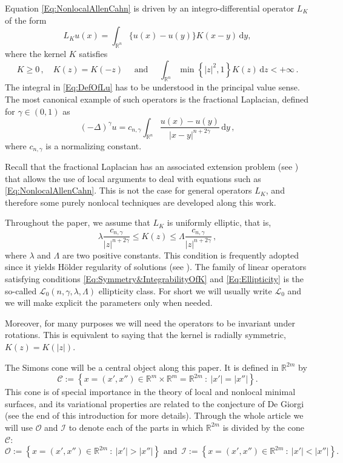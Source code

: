 \documentclass[12pt,reqno]{amsart}
\theoremstyle{definition}
\theoremstyle{remark}
\newcommand{\con}[1]{\mathbb{#1}}
\newcommand{\R}{\con{R}} %
\newcommand{\ccal}{\mathscr{C}}
\newcommand{\ical}{\mathcal{I}}
\newcommand{\lcal}{\mathcal{L}}
\newcommand{\ocal}{\mathcal{O}}
\newcommand{\s}{\gamma}
\newcommand{\fraclaplacian}{(-\Delta)^\s}
\renewcommand{\d}{\,\mathrm{d}} %
\newcommand{\setcond}[2]{\left \{ #1 \ : \ #2  \right \}}
\numberwithin{equation}{section}
\begin{document}
Equation \eqref{Eq:NonlocalAllenCahn} is driven by an integro-differential operator $L_K$ of the form
\begin{equation}
\label{Eq:DefOfLu}
L_Ku(x) = \int_{\R^n} \{u(x) - u(y)\} K(x-y)\d y,
\end{equation}
where the kernel $K$ satisfies
\begin{equation}
\label{Eq:Symmetry&IntegrabilityOfK}
K\geq 0\,, \quad K(z) = K(-z) \quad \textrm{ and } \quad \int_{\R^n} \min \left\{ |z|^2, 1 \right\} K(z) \d z < + \infty\,.
\end{equation}
The integral in \eqref{Eq:DefOfLu} has to be understood in the principal value sense. The most canonical example of such operators is the fractional Laplacian, defined for $\s\in(0,1)$ as
$$
\fraclaplacian u = c_{n, \s} \int_{\R^n} \dfrac{u(x) - u(y)}{|x-y|^{n + 2\s}}\d y\,,
$$
where $c_{n, \s}$ is a normalizing constant.

Recall that the fractional Laplacian has an associated extension problem (see \cite{CaffarelliSilvestre}) that allows the use of local arguments to deal with equations such as \eqref{Eq:NonlocalAllenCahn}. This is not the case for general operators $L_K$, and therefore some purely nonlocal techniques are developed along this work. 

Throughout the paper, we assume that $L_K$ is uniformly elliptic, that is,
\begin{equation}
\label{Eq:Ellipticity}
\lambda \dfrac{c_{n,\s}}{|z|^{n+2\s}} \leq K(z) \leq \Lambda \dfrac{c_{n,\s}}{|z|^{n+2\s}}\,, 
\end{equation}
where $\lambda$ and $\Lambda$ are two positive constants. This condition is frequently adopted since it yields Hölder regularity of solutions (see \cite{RosOton-Survey,SerraC2s+alphaRegularity}). The family of linear operators satisfying conditions \eqref{Eq:Symmetry&IntegrabilityOfK} and \eqref{Eq:Ellipticity} is the so-called $\lcal_0(n,\s,\lambda, \Lambda)$ ellipticity class. For short we will usually write $\lcal_0$ and we will make explicit the parameters only when needed. 

Moreover, for many  purposes we will need the operators to be invariant under rotations. This is equivalent to saying that the kernel is radially symmetric, $K(z) = K(|z|)$. 




The Simons cone will be a central object along this paper. It is defined in $\R^{2m}$ by
\begin{equation}
\label{Eq:SimonsCone}
\mathscr{C} := \setcond{x = (x', x'') \in \R^m \times \R^m=\R^{2m}}{|x'| = |x''|}.
\end{equation}
This cone is of special importance in the theory of local and nonlocal minimal surfaces, and its variational properties are related to the conjecture of De Giorgi (see the end of this introduction for more details). Through the whole article we will use $\ocal$ and $\ical$ to denote each of the parts in which $\R^{2m}$ is divided by the cone $\ccal$:
$$
\ocal:= \setcond{x = (x', x'') \in \R^{2m}}{|x'| > |x''|} \textrm{ and } \,
\ical:= \setcond{x = (x', x'') \in \R^{2m}}{|x'| < |x''|}\!.
$$
\end{document}
